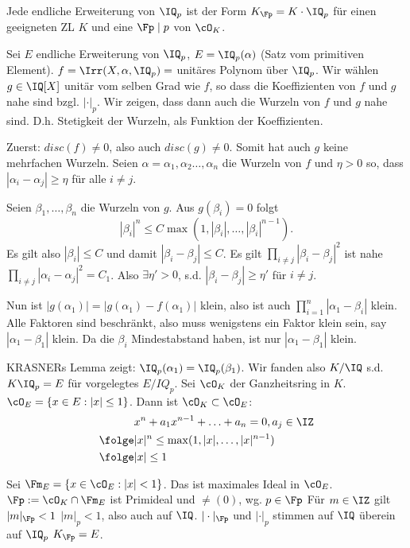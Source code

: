 \begin{Satz}
 Jede endliche Erweiterung von $\IQ_p$ ist der Form $K_\Fp=K\cdot \IQ_p$ für einen geeigneten ZL $K$ und eine $\Fp\mid p$ von $\cO_K$.
\end{Satz}

\begin{Beweis}
 Sei $E$ endliche Erweiterung von $\IQ_p$, $E=\IQ_p(\alpha)$ (Satz vom primitiven Element). $f=\Irr(X,\alpha,\IQ_p)=$ unitäres Polynom über $\IQ_p$. Wir wählen $g\in \IQ[X]$ unitär vom selben Grad wie $f$, so dass die Koeffizienten von $f$ und $g$ nahe sind bzgl. $|\cdot|_p$. Wir zeigen, dass dann auch die Wurzeln von $f$ und $g$ nahe sind. D.h. Stetigkeit der Wurzeln, als Funktion der Koeffizienten.
 
 Zuerst: $disc(f)\neq 0$, also auch $disc(g)\neq 0$. Somit hat auch $g$ keine mehrfachen Wurzeln.
 Seien $\alpha=\alpha_1,\alpha_2\ldots,\alpha_n$ die Wurzeln von $f$ und $\eta>0$ so, dass $|\alpha_i-\alpha_j|\geq \eta$ für alle $i\neq j$.
 
 Seien $\beta_1,\ldots,\beta_n$ die Wurzeln von $g$. Aus $g(\beta_i)=0$ folgt  \[ |\beta_i|^n\leq C\max(1,|\beta_i|,\ldots,|\beta_i|^{n-1}).\]
 Es gilt also $|\beta_i|\leq C$ und damit $|\beta_i-\beta_j|\leq C$. Es gilt $\prod_{i\neq j} |\beta_i-\beta_j|^2$ ist nahe $\prod_{i\neq j}|\alpha_i-\alpha_j|^2=C_1$. Also $\exists \eta'>0$, s.d. $|\beta_i-\beta_j|\geq \eta'$ für $i\neq j$.
 
 Nun ist $|g(\alpha_1)|=|g(\alpha_1)-f(\alpha_1)|$ klein, also ist auch $\prod_{i=1}^n|\alpha_1-\beta_i|$ klein. Alle Faktoren sind beschränkt, also muss wenigstens ein Faktor klein sein, say $|\alpha_1-\beta_1|$ klein. Da die $\beta_i$ Mindestabstand haben, ist nur $|\alpha_1-\beta_1|$ klein.
 
 KRASNERs Lemma zeigt: $\IQ_p(\alpha_1)=\IQ_p(\beta_1)$. Wir fanden also $K/\IQ$ s.d. $K\IQ_p=E$ für vorgelegtes $E/IQ_p$. Sei $\cO_K$ der Ganzheitsring in $K$. $\cO_E=\{ x\in E : |x|\leq 1\}$. Dann ist $\cO_K\subset\cO_E$: 
 \begin{align*}
  & x^n+a_1x^{n-1}+\ldots+a_n=0, a_j\in\IZ\\
  \folge & |x|^n\leq \max(1,|x|,\ldots,|x|^{n-1})\\
  \folge & |x| \leq 1
 \end{align*}

 Sei $\Fm_E=\{ x\in \cO_E : |x|<1\}$. Das ist maximales Ideal in $\cO_E$. $\Fp:=\cO_K\cap \Fm_E$ ist Primideal und $\neq (0)$, wg. $p\in\Fp$
 Für $m\in\IZ$ gilt $|m|_\Fp<1$ \gdw $|m|_p<1$, also auch auf $\IQ$.
 \folge $|\cdot|_\Fp$ und $|\cdot|_p$ stimmen auf $\IQ$ überein \folge auf $\IQ_p$ \folge $K_\Fp=E$.
 
\end{Beweis}
